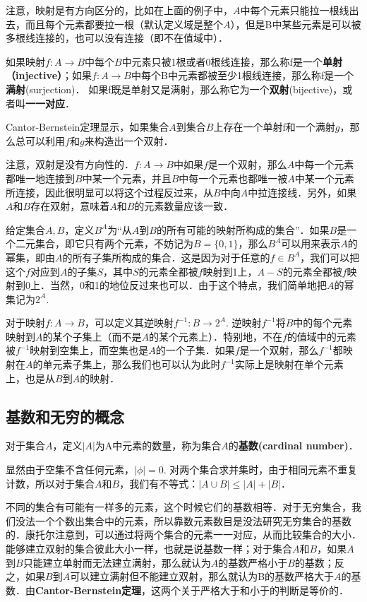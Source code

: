 注意，映射是有方向区分的，比如在上面的例子中，$A$中每个元素只能拉一根线出去，而且每个元素都要拉一根（默认定义域是整个$A$），但是B中某些元素是可以被多根线连接的，也可以没有连接（即不在值域中）．

如果映射$f:A\rightarrow B$中每个$B$中元素只被1根或者0根线连接，那么称f是一个\textbf{单射（injective）}；如果$f:A\rightarrow B$中每个B中元素都被至少1根线连接，那么称f是一个\textbf{满射}(surjection)． 如果f既是单射又是满射，那么称它为一个\textbf{双射}(bijective)，或者叫\textbf{一一对应}．

Cantor-Bernstein定理显示，如果集合$A$到集合$B$上存在一个单射f和一个满射$g$，那么总可以利用$f$和$g$来构造出一个双射．

注意，双射是没有方向性的．$f:A\rightarrow B$中如果$f$是一个双射，那么$A$中每一个元素都唯一地连接到$B$中某一个元素，并且$B$中每一个元素也都唯一被$A$中某一个元素所连接，因此很明显可以将这个过程反过来，从$B$中向$A$中拉连接线．另外，如果$A$和$B$存在双射，意味着$A$和$B$的元素数量应该一致．

给定集合$A, B$，定义$B^A$为“从$A$到$B$的所有可能的映射所构成的集合”．如果$B$是一个二元集合，即它只有两个元素，不妨记为$B=\{0,1\}$，那么$B^A$可以用来表示$A$的幂集，即由$A$的所有子集所构成的集合．这是因为对于任意的$f∈ B^A$，我们可以把这个$f$对应到$A$的子集$S$，其中$S$的元素全都被$f$映射到1上，$A-S$的元素全都被$f$映射到0上．当然，0和1的地位反过来也可以．由于这个特点，我们简单地把$A$的幂集记为$2^A$. 

对于映射$f:A\rightarrow B$，可以定义其逆映射$f^{-1}:B\rightarrow 2^A$. 逆映射$f^{-1}$将$B$中的每个元素映射到$A$的某个子集上（而不是$A$的某个元素上）．特别地，不在$f$的值域中的元素被$f^{-1}$映射到空集上，而空集也是$A$的一个子集．如果$f$是一个双射，那么$f^{-1}$都映射在$A$的单元素子集上，那么我们也可以认为此时$f^{-1}$实际上是映射在单个元素上，也是从$B$到$A$的映射．





\subsection{基数和无穷的概念}

对于集合$A$，定义$|A|$为A中元素的数量，称为集合$A$的\textbf{基数(cardinal number)}．

显然由于空集不含任何元素，$|\phi|=0$. 对两个集合求并集时，由于相同元素不重复计数，所以对于集合$A$和$B$，我们有不等式：$|A∪B|≤|A|+|B|$．

不同的集合有可能有一样多的元素，这个时候它们的基数相等．对于无穷集合，我们没法一个个数出集合中的元素，所以靠数元素数目是没法研究无穷集合的基数的．康托尔注意到，可以通过将两个集合的元素一一对应，从而比较集合的大小．能够建立双射的集合彼此大小一样，也就是说基数一样；对于集合$A$和$B$，如果$A$到$B$只能建立单射而无法建立满射，那么就认为$A$的基数严格小于$B$的基数；反之，如果$B$到$A$可以建立满射但不能建立双射，那么就认为B的基数严格大于$A$的基数．由\textbf{Cantor-Bernstein定理}，这两个关于严格大于和小于的判断是等价的．

